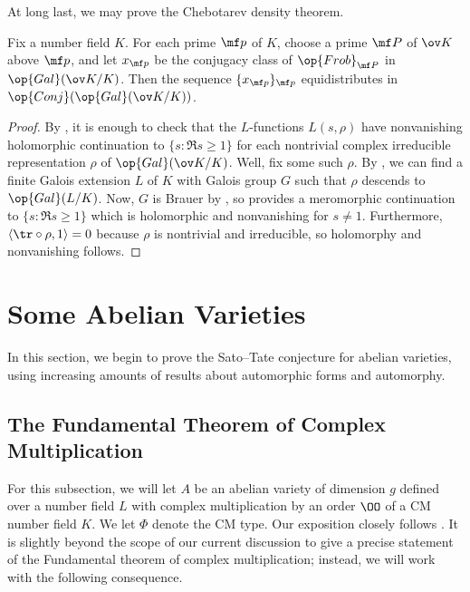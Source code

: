 \documentclass[../thesis.tex]{subfiles}
\begin{document}
At long last, we may prove the Chebotarev density theorem.
\begin{theorem}
	Fix a number field $K$. For each prime $\mf p$ of $K$, choose a prime $\mf P$ of $\ov K$ above $\mf p$, and let $x_{\mf p}$ be the conjugacy class of $\op{Frob}_{\mf P}$ in $\op{Gal}(\ov K/K)$. Then the sequence $\{x_{\mf p}\}_{\mf p}$ equidistributes in $\op{Conj}(\op{Gal}(\ov K/K))$.
\end{theorem}
\begin{proof}
	By , it is enough to check that the $L$-functions $L(s,\rho)$ have nonvanishing holomorphic continuation to $\{s:\Re s\ge1\}$ for each nontrivial complex irreducible representation $\rho$ of $\op{Gal}(\ov K/K)$. Well, fix some such $\rho$. By , we can find a finite Galois extension $L$ of $K$ with Galois group $G$ such that $\rho$ descends to $\op{Gal}(L/K)$. Now, $G$ is Brauer by , so  provides a meromorphic continuation to $\{s:\Re s\ge1\}$ which is holomorphic and nonvanishing for $s\ne1$. Furthermore, $\langle{\tr}\circ\rho,1\rangle=0$ because $\rho$ is nontrivial and irreducible, so holomorphy and nonvanishing follows.
\end{proof}

\section{Some Abelian Varieties}
In this section, we begin to prove the Sato--Tate conjecture for abelian varieties, using increasing amounts of results about automorphic forms and automorphy.

\subsection{The Fundamental Theorem of Complex Multiplication}
For this subsection, we will let $A$ be an abelian variety of dimension $g$ defined over a number field $L$ with complex multiplication by an order $\OO$ of a CM number field $K$. We let $\Phi$ denote the CM type. Our exposition closely follows \cite[Section~3]{conrad-cm}. It is slightly beyond the scope of our current discussion to give a precise statement of the Fundamental theorem of complex multiplication; instead, we will work with the following consequence.
\end{document}
